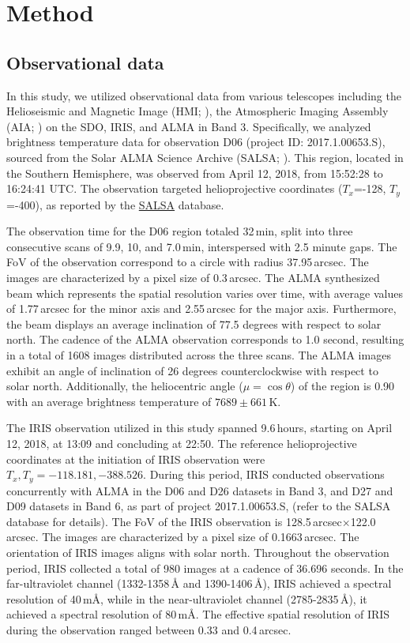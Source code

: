 \documentclass[a4paper,alpha-refs]{eSpectra}
\begin{document}
\section{Method}
\subsection{Observational data}

In this study, we utilized observational data from various telescopes including the Helioseismic and Magnetic Image (HMI; \cite{scherrer_helioseismic_2012}), the Atmospheric Imaging Assembly (AIA; \cite{lemen_atmospheric_2012}) on the SDO, IRIS, and ALMA in Band 3. Specifically, we analyzed brightness temperature data for observation D06 (project ID: 2017.1.00653.S), sourced from the Solar ALMA Science Archive  (SALSA; \cite{SALSA_guia}). This region, located in the Southern Hemisphere, was observed from April 12, 2018, from 15:52:28 to 16:24:41 UTC. The observation targeted helioprojective coordinates ($T_x$=-128, $T_y$=-400), as reported by the \href{http://sdc.uio.no/salsa/}{SALSA} database.



The observation time for the D06 region totaled 32\,min, split into three consecutive scans of 9.9, 10, and 7.0\,min, interspersed with 2.5 minute gaps. The FoV of the observation correspond to a circle with radius 37.95\,arcsec. The images are characterized by a pixel size of 0.3\,arcsec. The ALMA synthesized beam which represents the spatial resolution varies over time, with average values of 1.77\,arcsec for the minor axis and 2.55\,arcsec for the major axis. Furthermore, the  beam displays an average inclination of 77.5 degrees with respect to solar north. The cadence of the ALMA observation corresponds to 1.0 second, resulting in a total of 1608 images distributed across the three scans. The ALMA images exhibit an angle of inclination of 26 degrees counterclockwise with respect to solar north. Additionally,  the heliocentric angle ($\mu = \cos{\theta}$)  of the region is 0.90 with an average brightness temperature of $7689 \pm 661$\,K.  

The IRIS observation utilized in this study spanned 9.6\,hours, starting on April 12, 2018, at 13:09 and concluding at 22:50. The reference helioprojective coordinates at the initiation of IRIS observation were $T_x, T_y = -118.181, -388.526$. During this period, IRIS conducted observations concurrently with ALMA in the D06 and D26 datasets in Band 3, and D27 and D09 datasets in Band 6, as part of project 2017.1.00653.S, (refer to the SALSA database for details).  The FoV of the IRIS observation is 128.5\,arcsec$\times$122.0\,arcsec. The images are characterized by a pixel size of 0.1663\,arcsec. The orientation of IRIS images aligns with solar north. Throughout the observation period, IRIS collected a total of 980 images at a cadence of 36.696 seconds. In the far-ultraviolet channel (1332-1358\,Å and 1390-1406\,Å), IRIS achieved a spectral resolution of 40\,mÅ, while in the near-ultraviolet channel (2785-2835\,Å), it achieved a spectral resolution of 80\,mÅ. The effective spatial resolution of IRIS during the observation ranged between 0.33 and 0.4\,arcsec.
\end{document}

